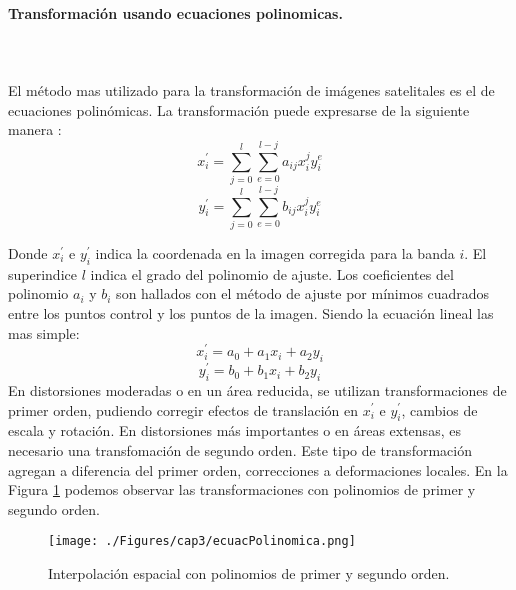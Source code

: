 \paragraph{Transformación usando ecuaciones polinomicas. }\mbox{}\\\mbox{}\\
El m\'etodo mas utilizado para la transformaci\'on de im\'agenes satelitales  es el de ecuaciones polin\'omicas. La transformaci\'on puede expresarse de la siguiente manera \cite{guide1999erdas}:
	\begin{equation}
	x^{'}_{i} = \sum_{j=0}^{l} \sum_{e=0}^{l-j} a_{ij}x^{j}_{i}y^{e}_{i}
	\end{equation} 
		\begin{equation}
		y^{'}_{i} = \sum_{j=0}^{l} \sum_{e=0}^{l-j} b_{ij}x^{j}_{i}y^{e}_{i}
		\end{equation} 


Donde $ x^{'}_{i} $ e $ y^{'}_{i} $ indica la coordenada en la imagen corregida para la banda $ i $. El superindice $ l $ indica el grado del polinomio de ajuste. Los coeficientes del polinomio $ a_{i} $ y $ b_{i} $ son hallados con el m\'etodo de ajuste por m\'inimos cuadrados entre los puntos control y los puntos de la imagen. Siendo la ecuaci\'on lineal las mas simple:
	\begin{equation}
	x^{'}_{i} = a_{0}+a_{1}x_{i}+a_{2}y_{i}
	\end{equation} 
		\begin{equation}
		y^{'}_{i} = b_{0}+b_{1}x_{i}+b_{2}y_{i}
		\end{equation} 
En distorsiones moderadas o en un \'area reducida, se utilizan transformaciones de primer orden, pudiendo corregir efectos de translaci\'on en $ x^{'}_{i} $ e $ y^{'}_{i} $, cambios de escala y rotaci\'on.
En distorsiones m\'as importantes o en \'areas extensas, es necesario una transfomaci\'on de segundo orden. Este tipo de transformaci\'on agregan a diferencia del primer orden, correcciones a deformaciones locales.
En la Figura \ref{fig:intPolEcua} podemos observar las transformaciones con polinomios de primer y segundo orden.
    \begin{figure}[H]
    	\centering
    	\texttt{[image: ./Figures/cap3/ecuacPolinomica.png]}
    	\caption{Interpolaci\'on espacial con polinomios de primer y segundo orden.}
    	\label{fig:intPolEcua}
    \end{figure}
    
